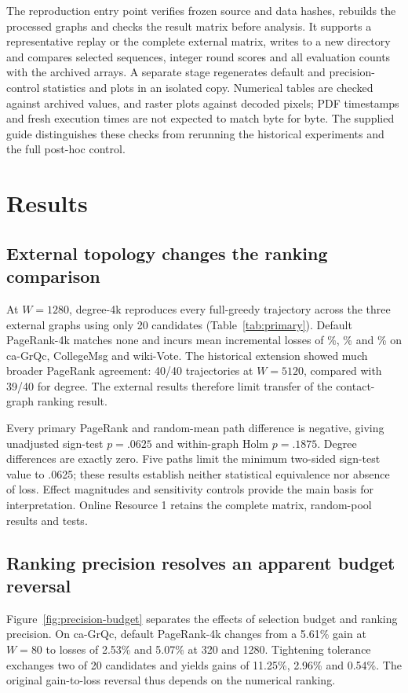 \documentclass[smallextended]{svjour3}
\begin{document}
The reproduction entry point verifies frozen source and data hashes, rebuilds the processed graphs and checks the result matrix before analysis. It supports a representative replay or the complete external matrix, writes to a new directory and compares selected sequences, integer round scores and all evaluation counts with the archived arrays. A separate stage regenerates default and precision-control statistics and plots in an isolated copy. Numerical tables are checked against archived values, and raster plots against decoded pixels; PDF timestamps and fresh execution times are not expected to match byte for byte. The supplied guide distinguishes these checks from rerunning the historical experiments and the full post-hoc control.

\section{Results}
\subsection{External topology changes the ranking comparison}
At $W=1280$, degree-4k reproduces every full-greedy trajectory across the three external graphs using only 20 candidates (Table~\ref{tab:primary}). Default PageRank-4k matches none and incurs mean incremental losses of \GrqcPRLoss{}\%, \CollegePRLoss{}\% and \WikiPRLoss{}\% on ca-GrQc, CollegeMsg and wiki-Vote. The historical extension showed much broader PageRank agreement: 40/40 trajectories at $W=5120$, compared with 39/40 for degree. The external results therefore limit transfer of the contact-graph ranking result.


Every primary PageRank and random-mean path difference is negative, giving unadjusted sign-test $p=.0625$ and within-graph Holm $p=.1875$. Degree differences are exactly zero. Five paths limit the minimum two-sided sign-test value to .0625; these results establish neither statistical equivalence nor absence of loss. Effect magnitudes and sensitivity controls provide the main basis for interpretation. Online Resource 1 retains the complete matrix, random-pool results and tests.

\subsection{Ranking precision resolves an apparent budget reversal}
Figure~\ref{fig:precision-budget} separates the effects of selection budget and ranking precision. On ca-GrQc, default PageRank-4k changes from a 5.61\% gain at $W=80$ to losses of 2.53\% and 5.07\% at 320 and 1280. Tightening tolerance exchanges two of 20 candidates and yields gains of 11.25\%, 2.96\% and 0.54\%. The original gain-to-loss reversal thus depends on the numerical ranking.
\end{document}
